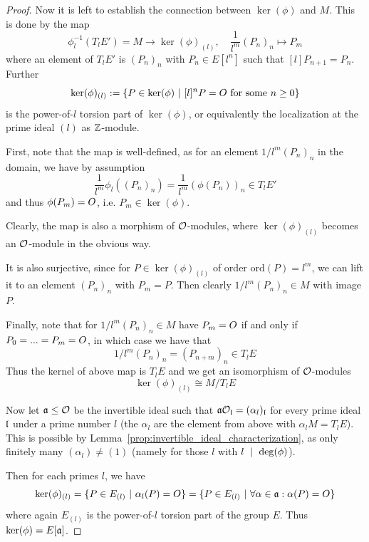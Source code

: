 \begin{proof}
    Now it is left to establish the connection between $\ker(\phi)$ and $M$.
    This is done by the map
    \begin{equation*}
        \phi_l^{-1}(T_lE') = M \to \ker(\phi)_{(l)}, \quad \frac 1 {l^m} (P_n)_n \mapsto P_m
    \end{equation*}
    where an element of $T_lE'$ is $(P_n)_n$ with $P_n \in E[l^n]$ such that $[l]P_{n + 1} = P_n$.
    Further
    \begin{equation*}
        \ker(\phi)_{(l)} := \{ P \in \ker(\phi) \ | \ \text{$[l]^nP = O$ for some $n \geq 0$}\}
    \end{equation*}
    is the power-of-$l$ torsion part of $\ker(\phi)$, or equivalently the localization at the prime ideal $(l)$ as $\mathbb{Z}$-module.

    First, note that the map is well-defined, as for an element $1/l^m (P_n)_n$ in the domain, we have by assumption
    \begin{equation*}
        \frac 1 {l^m} \phi_l((P_n)_n) = \frac 1 {l^m} (\phi(P_n))_n \in T_lE'
    \end{equation*}
    and thus $\phi(P_m) = O$, i.e. $P_m \in \ker(\phi)$.

    Clearly, the map is also a morphism of $\mathcal{O}$-modules, where $\ker(\phi)_{(l)}$ becomes an $\mathcal{O}$-module in the obvious way.
    
    It is also surjective, since for $P \in \ker(\phi)_{(l)}$ of order $\mathrm{ord}(P) = l^m$, we can lift it to an element $(P_n)_n$ with $P_m = P$.
    Then clearly $1/l^m(P_n)_n \in M$ with image $P$.

    Finally, note that for $1/l^m(P_n)_n \in M$ have $P_m = O$ if and only if $P_0 = ... = P_m = O$, in which case we have that
    \begin{equation*}
        1/l^m(P_n)_n = (P_{n + m})_n \in T_lE
    \end{equation*}
    Thus the kernel of above map is $T_lE$ and we get an isomorphism of $\mathcal{O}$-modules
    \begin{equation*}
        \ker(\phi)_{(l)} \cong M / T_lE
    \end{equation*}

    Now let $\mathfrak{a} \leq \mathcal{O}$ be the invertible ideal such that $\mathfrak{a}\mathcal{O}_{\mathfrak{l}} = (\alpha_l)_{\mathfrak{l}}$ for every prime ideal $\mathfrak{l}$ under a prime number $l$ (the $\alpha_l$ are the element from above with $\alpha_l M = T_lE$).
    This is possible by Lemma~\ref{prop:invertible_ideal_characterization}, as only finitely many $(\alpha_l) \neq (1)$ (namely for those $l$ with $l \ \mid \  \deg(\phi)$).

    Then for each primes $l$, we have
    \begin{equation*}
        \ker(\phi)_{(l)} = \{ P \in E_{(l)} \ | \ \alpha_l(P) = O \} = \{ P \in E_{(l)} \ | \ \forall \alpha \in \mathfrak{a}: \alpha(P) = O \}
    \end{equation*}
    where again $E_{(l)}$ is the power-of-$l$ torsion part of the group $E$.
    Thus $\ker(\phi) = E[\mathfrak{a}]$.
\end{proof}

